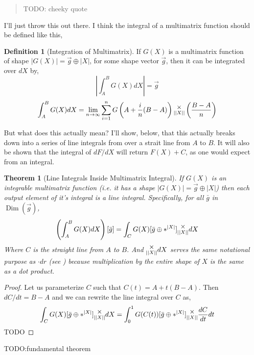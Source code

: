 \documentclass[12pt]{book}
\theoremstyle{plain}
\newtheorem{theorem}{Theorem}[chapter]
\theoremstyle{definition}
\newtheorem{definition}{Definition}[chapter]
\theoremstyle{ppart}
\theoremstyle{case}
\theoremstyle{solution}
\DeclareMathOperator{\Dim}{Dim}
\newcommand{\mmult}[1]{\text{\raisebox{1ex}{$\underset{#1}{\times}$}}}
\newcommand{\shape}[1]{\left|#1\right|}
\begin{document}
\begin{quote}
TODO: cheeky quote
\end{quote}

I'll just throw this out there. I think the integral of a multimatrix function should
be defined like this,

\begin{definition}[Integration of Multimatrix]
If $G(X)$ is a multimatrix function of shape $\shape{G(X)} = \vec{g} \oplus \shape{X}$,
for some shape vector $\vec{g}$, then it can be integrated over $dX$ by,
\[ \shape{\int_A^B G(X) dX} = \vec{g} \]
\[
 \int_A^B G(X) dX = \lim_{n \to \infty}
 \sum_{i=1}^n
  G\left(A+\frac{i}{n}(B-A)\right)
  \mmult{\shape{\shape{X}}}
  \left(\frac{B-A}{n}\right)
\]
\end{definition}

But what does this actually mean? I'll show, below, that this actually breaks down into
a series of line integrals from over a strait line from $A$ to $B$. It will also be
shown that the integral of $dF/dX$ will return $F(X) + C$, as one would expect from an
integral.

\begin{theorem}[Line Integrals Inside Multimatrix Integral]
If $G(X)$ is an integrable multimatrix function (i.e. it has a shape
$\shape{G(X)} = \vec{g} \oplus \shape{X}$) then each output element of it's
integral is a line integral.
Specifically, for all $\bar{g}$ in $\Dim(\vec{g})$,
\[ \left(\int_A^B G(X) dX\right)[\bar{g}] = \int_C G(X)[\bar{g} \oplus *^{\shape{X}}] \mmult{\shape{\shape{X}}} dX \]
Where $C$ is the straight line from $A$ to $B$. And $\mmult{\shape{\shape{X}}} dX$ serves the same notational purpose as
$\cdot dr$ (see \cite{wiki:line_int}) because multiplication by the entire shape of $X$ is the same as a dot product.
\end{theorem}
\begin{proof}
Let us parameterize $C$ such that $C(t) = A + t(B-A)$. Then $dC/dt = B-A$ and
we can rewrite the line integral over $C$ as,
\[ \int_C G(X)[\bar{g} \oplus *^{\shape{X}}] \mmult{\shape{\shape{X}}} dX = \int_0^1 G(C(t))[\bar{g} \oplus *^{\shape{X}}] \mmult{\shape{\shape{X}}} \frac{dC}{dt} dt \]
TODO
\end{proof}

TODO:fundamental theorem
\end{document}
